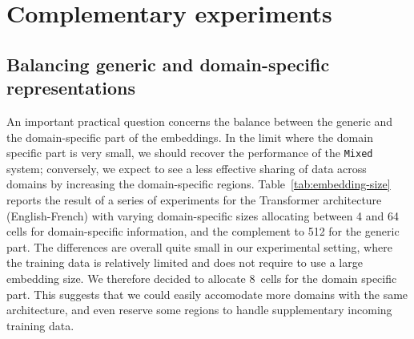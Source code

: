 \documentclass[11pt,a4paper]{article}
\newcommand{\fyTodo}[1]{\Todo[FY:]{\textcolor{orange}{#1}}}
\newcommand{\fyDone}[1]{\done[FY]\Todo[FY:]{\textcolor{orange}{#1}}}
\begin{document}
\section{Complementary experiments\label{sec:Discussion}}

\subsection{Balancing generic and domain-specific representations\label{secc:region_size}}

An important practical question concerns the balance between the generic and the domain-specific part of the embeddings. In the limit where the domain specific part is very small, we should recover the performance of the \texttt{Mixed} system; conversely, we expect to see a less effective sharing of data across domains by increasing the domain-specific regions. Table~\ref{tab:embedding-size} reports the result of  a series of experiments for the Transformer architecture (English-French) with varying domain-specific sizes allocating between 4 and 64 cells for domain-specific information, and the complement to 512 for the generic part. The differences are overall quite small in our experimental setting, where the training data is relatively limited and does not require to use a large embedding size. We therefore decided to allocate $8$~cells for the domain specific part. This suggests that we could easily accomodate more domains with the same architecture, and even reserve some regions to handle supplementary incoming training data.  
\fyDone{Given the ways embeddings are computed, why not add more domains, and test robustness agains data presentation order ?}
\end{document}
